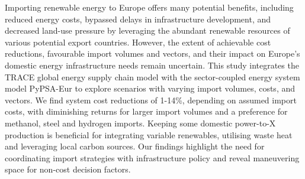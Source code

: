 
Importing renewable energy to Europe offers many potential benefits, including
reduced energy costs, bypassed delays in infrastructure development, and
decreased land-use pressure by leveraging the abundant renewable resources of
various potential export countries.
However, the extent of achievable cost reductions, favourable import volumes and
vectors, and their impact on Europe's domestic energy infrastructure needs
remain uncertain.
This study integrates the TRACE global energy supply chain model with the
sector-coupled energy system model PyPSA-Eur to explore scenarios with varying
import volumes, costs, and vectors.
We find system cost reductions of 1-14\%, depending on assumed import costs,
with diminishing returns for larger import volumes and a preference for
methanol, steel and hydrogen imports. Keeping some domestic power-to-X
production is beneficial for integrating variable renewables, utilising waste
heat and leveraging local carbon sources.
Our findings highlight the need for coordinating import strategies with
infrastructure policy and reveal maneuvering space for non-cost decision
factors.
